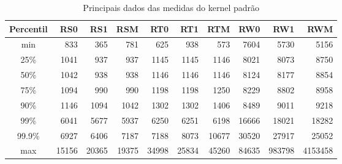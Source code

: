\begin{table}[!p]
\centering
\begin{center}
\begin{tabular}{|c|r|r|r|r|r|r|r|r|r|}
\toprule
Percentil &    RS0 &     RS1 &    RSM &    RT0 &    RT1 &    RTM &    RW0 &     RW1 &      RWM \\
\midrule
    min &    833 &    365 &    781 &    625 &    938 &    573 &   7604 &    5730 &     5156 \\
    25\% &   1041 &    937 &    937 &   1145 &   1145 &   1146 &   8021 &    8073 &     8750 \\
    50\% &   1042 &    938 &    938 &   1146 &   1146 &   1146 &   8124 &    8177 &     8854 \\
    75\% &   1094 &    990 &    990 &   1198 &   1198 &   1250 &   8229 &    8802 &     8958 \\
    90\% &   1146 &   1094 &   1042 &   1302 &   1302 &   1406 &   8489 &    9011 &     9218 \\
    99\% &   6041 &   5677 &   5937 &   6250 &   6251 &   6198 &  16666 &   18021 &    18282 \\
  99.9\% &   6927 &   6406 &   7187 &   7188 &   8073 &  10677 &  30520 &   27917 &    25052 \\
    max &  15156 &  20365 &  19375 &  34998 &  25834 &  45260 &  84635 &  983798 &  4153458 \\
\bottomrule
\end{tabular}
\end{center}
\caption{Principais dados das medidas do kernel padrão}
\label{table:rpi}
\end{table}

